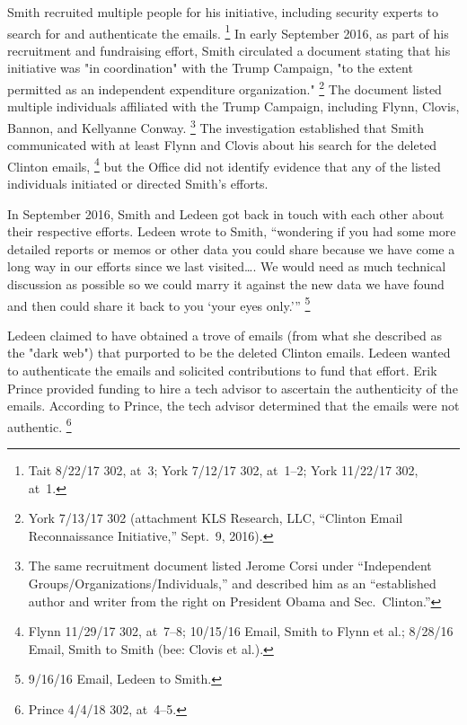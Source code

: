 Smith recruited multiple people for his initiative, including security experts to search for and authenticate the emails.%
\footnote{Tait 8/22/17 302, at~3; York 7/12/17 302, at~1--2; York 11/22/17 302, at~1.}
In early September 2016, as part of his recruitment and fundraising effort, Smith circulated a document stating that his initiative was "in coordination" with the Trump Campaign, "to the extent permitted as an independent expenditure organization."%
\footnote{York 7/13/17 302 (attachment KLS Research, LLC, ``Clinton Email Reconnaissance Initiative,'' Sept.~9, 2016).}
The document listed multiple individuals affiliated with the Trump Campaign, including Flynn, Clovis, Bannon,
and Kellyanne Conway.%
\footnote{The same recruitment document listed Jerome Corsi under ``Independent Groups/Organizations/Individuals,'' and described him as an ``established author and writer from the right on President Obama and Sec.~Clinton.''}
The investigation established that Smith communicated with at least Flynn and Clovis about his search for the deleted Clinton emails,%
\footnote{Flynn 11/29/17 302, at~7--8; 10/15/16 Email, Smith to Flynn et al.;
8/28/16 Email, Smith to Smith (bee: Clovis et al.).}
but the Office did not identify evidence that any of the listed individuals initiated or directed Smith's efforts.

In September 2016, Smith and Ledeen got back in touch with each other about their respective efforts.
Ledeen wrote to Smith, ``wondering if you had some more detailed reports or memos or other data you could share because we have come a long way in our efforts since we last visited\dots.
We would need as much technical discussion as possible so we could marry it against the new data we have found and then could share it back to you `your eyes only.'\thinspace''%
\footnote{9/16/16 Email, Ledeen to Smith.}

Ledeen claimed to have obtained a trove of emails (from what she described as the "dark web") that purported to be the deleted Clinton emails.
Ledeen wanted to authenticate the emails and solicited contributions to fund that effort.
Erik Prince provided funding to hire a tech advisor to ascertain the authenticity of the emails.
According to Prince, the tech advisor determined that the emails were not authentic.%
\footnote{Prince 4/4/18 302, at~4--5.}

